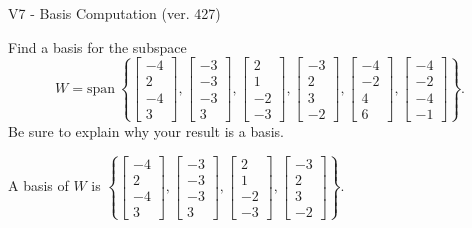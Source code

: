 \begin{exercise}
  \begin{exerciseTitle}V7 - Basis Computation (ver. 427)\end{exerciseTitle}
  \begin{exerciseStatement}
    Find a basis for the subspace 
\[W=\mathrm{span}\ \left\{\left[\begin{array}{r}
-4 \\
2 \\
-4 \\
3
\end{array}\right] , \left[\begin{array}{r}
-3 \\
-3 \\
-3 \\
3
\end{array}\right] , \left[\begin{array}{r}
2 \\
1 \\
-2 \\
-3
\end{array}\right] , \left[\begin{array}{r}
-3 \\
2 \\
3 \\
-2
\end{array}\right] , \left[\begin{array}{r}
-4 \\
-2 \\
4 \\
6
\end{array}\right] , \left[\begin{array}{r}
-4 \\
-2 \\
-4 \\
-1
\end{array}\right]\right\}.\]
 Be sure to explain why your result is a basis.


  \end{exerciseStatement}
  \begin{exerciseAnswer}
   A basis of \(W\) is  \(\left\{\left[\begin{array}{r}
-4 \\
2 \\
-4 \\
3
\end{array}\right] , \left[\begin{array}{r}
-3 \\
-3 \\
-3 \\
3
\end{array}\right] , \left[\begin{array}{r}
2 \\
1 \\
-2 \\
-3
\end{array}\right] , \left[\begin{array}{r}
-3 \\
2 \\
3 \\
-2
\end{array}\right]\right\}\).
  


  \end{exerciseAnswer}
\end{exercise}